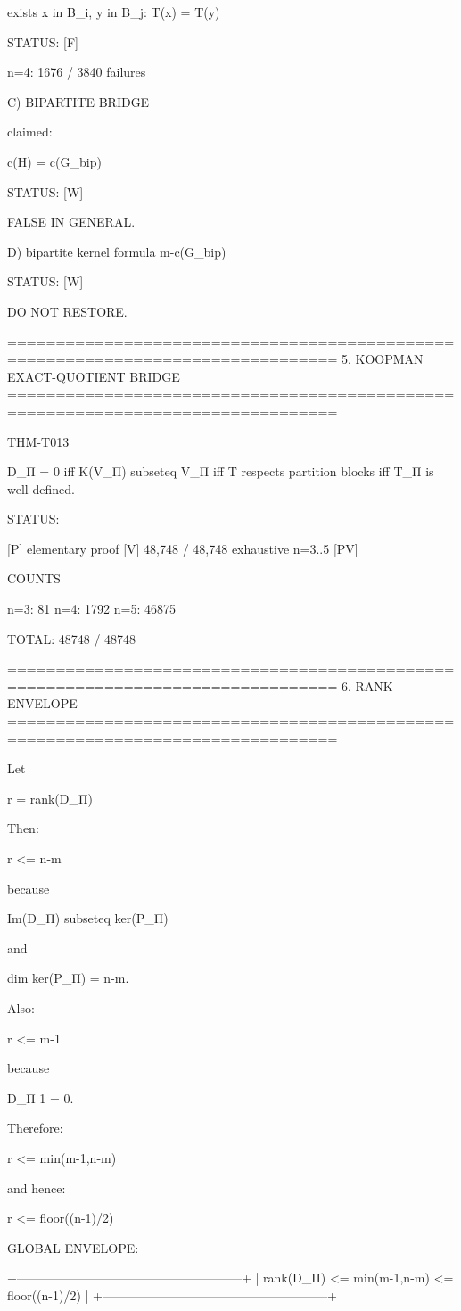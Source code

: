 exists x in B_i, y in B_j:
T(x) = T(y)

STATUS: [F]

n=4:
1676 / 3840 failures

C) BIPARTITE BRIDGE

claimed:

c(H) = c(G_bip)

STATUS: [W]

FALSE IN GENERAL.

D) bipartite kernel formula m-c(G_bip)

STATUS: [W]

DO NOT RESTORE.

================================================================================
5. KOOPMAN EXACT-QUOTIENT BRIDGE
================================================================================

THM-T013

D_Π = 0
iff
K(V_Π) subseteq V_Π
iff
T respects partition blocks
iff
T_Π is well-defined.

STATUS:

[P] elementary proof
[V] 48,748 / 48,748 exhaustive n=3..5
[PV]

COUNTS

n=3:    81
n=4:  1792
n=5: 46875

TOTAL:
48748 / 48748

================================================================================
6. RANK ENVELOPE
================================================================================

Let

r = rank(D_Π)

Then:

r <= n-m

because

Im(D_Π) subseteq ker(P_Π)

and

dim ker(P_Π) = n-m.

Also:

r <= m-1

because

D_Π 1 = 0.

Therefore:

             r <= min(m-1,n-m)

and hence:

             r <= floor((n-1)/2)

GLOBAL ENVELOPE:

+------------------------------------------------------+
| rank(D_Π) <= min(m-1,n-m) <= floor((n-1)/2)         |
+------------------------------------------------------+

